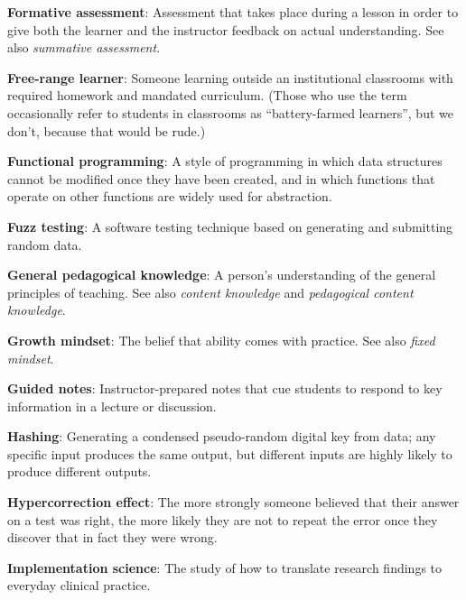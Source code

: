 \textbf{\hypertarget{g:formative-assessment}{Formative assessment}\label{g:formative-assessment}}: Assessment
that takes place during a lesson in order to give both the learner and
the instructor feedback on actual understanding. See also \emph{summative
assessment}.

\textbf{\hypertarget{g:free-range-learner}{Free-range learner}\label{g:free-range-learner}}: Someone learning
outside an institutional classrooms with required homework and mandated
curriculum. (Those who use the term occasionally refer to students in
classrooms as ``battery-farmed learners'', but we don't, because that
would be rude.)

\textbf{\hypertarget{g:functional-programming}{Functional programming}\label{g:functional-programming}}: A style
of programming in which data structures cannot be modified once they
have been created, and in which functions that operate on other
functions are widely used for abstraction.

\textbf{\hypertarget{g:fuzz-testing}{Fuzz testing}\label{g:fuzz-testing}}: A software testing technique
based on generating and submitting random data.

\textbf{\hypertarget{g:general-pedagogical-knowledge}{General pedagogical knowledge}\label{g:general-pedagogical-knowledge}}:
A person's understanding of the general principles of teaching. See also
\emph{content knowledge} and \emph{pedagogical content knowledge}.

\textbf{\hypertarget{g:growth-mindset}{Growth mindset}\label{g:growth-mindset}}: The belief that ability
comes with practice. See also \emph{fixed mindset}.

\textbf{\hypertarget{g:guided-notes}{Guided notes}\label{g:guided-notes}}: Instructor-prepared notes
that cue students to respond to key information in a lecture or
discussion.

\textbf{\hypertarget{g:hashing}{Hashing}\label{g:hashing}}: Generating a condensed pseudo-random
digital key from data; any specific input produces the same output, but
different inputs are highly likely to produce different outputs.

\textbf{\hypertarget{g:hypercorrection}{Hypercorrection effect}\label{g:hypercorrection}}: The more
strongly someone believed that their answer on a test was right, the
more likely they are not to repeat the error once they discover that in
fact they were wrong.

\textbf{\hypertarget{g:implementation-science}{Implementation science}\label{g:implementation-science}}: The study
of how to translate research findings to everyday clinical practice.

